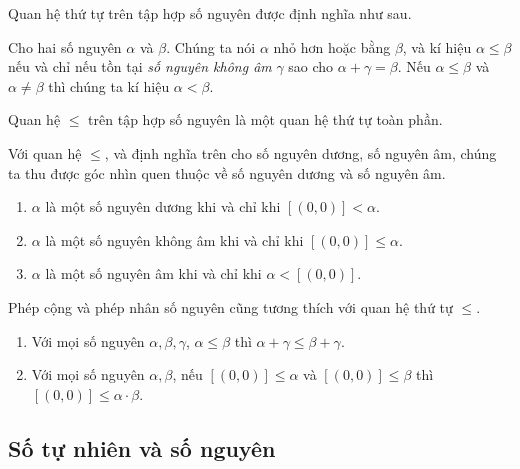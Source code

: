 Quan hệ thứ tự trên tập hợp số nguyên được định nghĩa như sau.
\begin{definition}
    Cho hai số nguyên $\alpha$ và $\beta$. Chúng ta nói $\alpha$ nhỏ hơn hoặc bằng $\beta$, và kí hiệu $\alpha\leq \beta$ nếu và chỉ nếu tồn tại \textit{số nguyên không âm} $\gamma$ sao cho $\alpha + \gamma = \beta$. Nếu $\alpha\leq \beta$ và $\alpha\ne \beta$ thì chúng ta kí hiệu $\alpha < \beta$.
\end{definition}

\begin{theorem}
    Quan hệ $\leq$ trên tập hợp số nguyên là một quan hệ thứ tự toàn phần.
\end{theorem}

Với quan hệ $\leq$, và định nghĩa trên cho số nguyên dương, số nguyên âm, chúng ta thu được góc nhìn quen thuộc về số nguyên dương và số nguyên âm.
\begin{enumerate}[label={(\roman*)}]
    \item $\alpha$ là một số nguyên dương khi và chỉ khi $[(0,0)] < \alpha$.
    \item $\alpha$ là một số nguyên không âm khi và chỉ khi $[(0,0)] \leq \alpha$.
    \item $\alpha$ là một số nguyên âm khi và chỉ khi $\alpha < [(0,0)]$.
\end{enumerate}

Phép cộng và phép nhân số nguyên cũng tương thích với quan hệ thứ tự $\leq$.
\begin{theorem}\label{theorem:integers-order-and-operations}
    \begin{enumerate}[label={(\roman*)}]
        \item Với mọi số nguyên $\alpha, \beta, \gamma$, $\alpha\leq \beta$ thì $\alpha + \gamma\leq \beta + \gamma$.
        \item Với mọi số nguyên $\alpha, \beta$, nếu $[(0,0)]\leq\alpha$ và $[(0,0)]\leq\beta$ thì $[(0,0)]\leq\alpha\cdot\beta$.
    \end{enumerate}
\end{theorem}

\subsection{Số tự nhiên và số nguyên}

